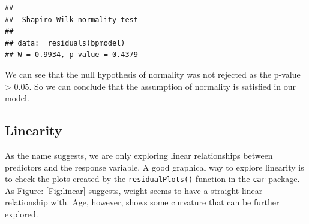 \documentclass[10pt, letterpaper, twoside]{memoir}\usepackage{knitr}
\begin{document}
\begin{knitrout}
\color{fgcolor}\begin{kframe}
\begin{alltt}
\hlstd{(}
\end{alltt}
\begin{verbatim}
## 
## 	Shapiro-Wilk normality test
## 
## data:  residuals(bpmodel)
## W = 0.9934, p-value = 0.4379
\end{verbatim}
\end{kframe}
\end{knitrout}

We can see that the null hypothesis of normality was not rejected as the p-value > 0.05. So we can conclude that the assumption of normality is satisfied in our model. 

\subsection{Linearity}

As the name suggests, we are only exploring linear relationships between predictors and the response variable. A good graphical way to explore linearity is to check the plots created by the \texttt{residualPlots()}  function in the \texttt{car}  package. As Figure: \ref{Fig:linear} suggests, weight seems to have a straight linear relationship with. Age, however, shows some curvature that can be further explored.
\end{document}
